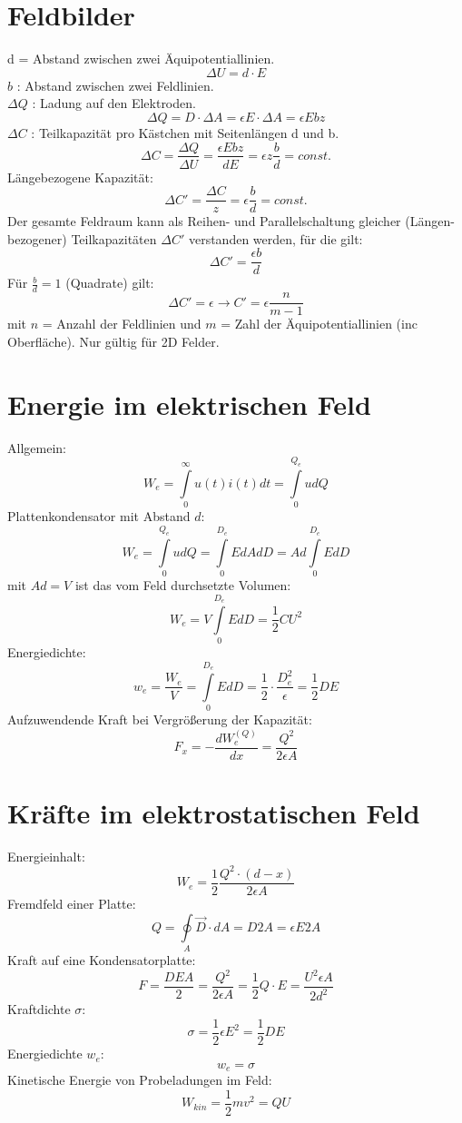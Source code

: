 \documentclass[12pt,a4paper]{article}
\begin{document}
\section{Feldbilder}
d = Abstand zwischen zwei Äquipotentiallinien.
\[\Delta U = d\cdot E\]
$b$ : Abstand zwischen zwei Feldlinien.\\
$\Delta Q$ : Ladung auf den Elektroden.\\
\[\Delta Q = D\cdot \Delta A = \epsilon E\cdot \Delta A = \epsilon Ebz\]
$\Delta C$ : Teilkapazität pro Kästchen mit Seitenlängen d und b.
\[\Delta C = \frac{\Delta Q}{\Delta U} = \frac{\epsilon E b z}{dE} = \epsilon z \frac{b}{d} = const.\]
Längebezogene Kapazität:
\[\Delta C' = \frac{\Delta C}{z}= \epsilon \frac{b}{d} = const.\]
Der gesamte Feldraum kann als Reihen- und Parallelschaltung gleicher (Längen-bezogener) Teilkapazitäten $\Delta C'$ verstanden werden, für die gilt:
\[\Delta C' = \frac{\epsilon b}{d}\]
Für $\frac{b}{d} = 1$ (Quadrate) gilt:
\[\Delta C' = \epsilon \rightarrow C' = \epsilon \frac{n}{m-1}\]
mit $n$ = Anzahl der Feldlinien und $m$ = Zahl der Äquipotentiallinien (inc Oberfläche). Nur gültig für 2D Felder.

\section{Energie im elektrischen Feld}
Allgemein:
\[W_e = \int\limits_0^\infty{u(t)i(t)dt} = \int\limits_0^{Q_e}{udQ}\]
Plattenkondensator mit Abstand $d$:\\
\[W_e = \int\limits_0^{Q_e}{udQ} = \int\limits_0^{D_e}{EdAdD} = Ad\int\limits_0^{D_e}{EdD}\]
 mit $Ad = V$ ist das vom Feld durchsetzte Volumen:\\
\[W_e = V \int\limits_0^{D_e}{EdD} = \frac{1}{2} CU^2\]
Energiedichte:
\[w_e = \frac{W_e}{V} = \int\limits_0^{D_e}{EdD} = \frac{1}{2} \cdot \frac{D_e^2}{\epsilon} = \frac{1}{2} DE\]
Aufzuwendende Kraft bei Vergrößerung der Kapazität:
\[F_x = -\frac{dW_e^{(Q)}}{dx} = \frac{Q^2}{2\epsilon A}\]

\section{Kräfte im elektrostatischen Feld}
Energieinhalt:
\[W_e = \frac{1}{2} \frac{Q^2\cdot (d-x)}{2\epsilon A}\]
Fremdfeld einer Platte: 
\[Q = \oint\limits_A{\vec{D}\cdot dA} = D 2 A = \epsilon E 2 A\]
Kraft auf eine Kondensatorplatte:
\[F = \frac{DEA}{2} = \frac{Q^2}{2 \epsilon A}=\frac{1}{2} Q\cdot E = \frac{U^2\epsilon A}{2d^2}\]
Kraftdichte $\sigma$:
\[\sigma = \frac{1}{2}\epsilon E^2 = \frac{1}{2} DE\]
Energiedichte $w_e$: 
\[w_e = \sigma\]
Kinetische Energie von Probeladungen im Feld: 
\[W_{kin} = \frac{1}{2}mv^2 = QU\]
\end{document}
